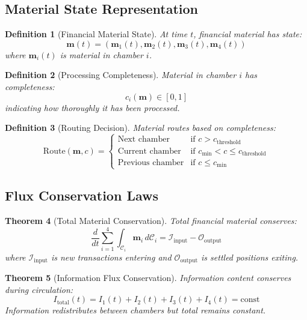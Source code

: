 \documentclass[12pt]{article}
\newtheorem{theorem}{Theorem}
\newtheorem{definition}[theorem]{Definition}
\begin{document}
\subsection{Material State Representation}

\begin{definition}[Financial Material State]
At time $t$, financial material has state:
$$
\mathbf{m}(t) = (\mathbf{m}_1(t), \mathbf{m}_2(t), \mathbf{m}_3(t), \mathbf{m}_4(t))
$$
where $\mathbf{m}_i(t)$ is material in chamber $i$.
\end{definition}

\begin{definition}[Processing Completeness]
Material in chamber $i$ has completeness:
$$
c_i(\mathbf{m}) \in [0,1]
$$
indicating how thoroughly it has been processed.
\end{definition}

\begin{definition}[Routing Decision]
Material routes based on completeness:
$$
\text{Route}(\mathbf{m}, c) = \begin{cases}
\text{Next chamber} & \text{if } c > c_{\text{threshold}} \\
\text{Current chamber} & \text{if } c_{\text{min}} < c \leq c_{\text{threshold}} \\
\text{Previous chamber} & \text{if } c \leq c_{\text{min}}
\end{cases}
$$
\end{definition}

\subsection{Flux Conservation Laws}

\begin{theorem}[Total Material Conservation]
Total financial material conserves:
$$
\frac{d}{dt}\sum_{i=1}^{4} \int_{\mathcal{C}_i} \mathbf{m}_i \, d\mathcal{C}_i = \mathcal{I}_{\text{input}} - \mathcal{O}_{\text{output}}
$$
where $\mathcal{I}_{\text{input}}$ is new transactions entering and $\mathcal{O}_{\text{output}}$ is settled positions exiting.
\end{theorem}

\begin{theorem}[Information Flux Conservation]
Information content conserves during circulation:
$$
I_{\text{total}}(t) = I_1(t) + I_2(t) + I_3(t) + I_4(t) = \text{const}
$$
Information redistributes between chambers but total remains constant.
\end{theorem}
\end{document}
